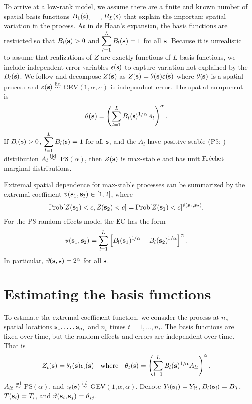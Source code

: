 \documentclass[aoas]{imsart}
\begin{document}
To arrive at a low-rank model, we assume there are a finite and known number of spatial basis functions $B_1(\mathbf{s}), \ldots, B_L(\mathbf{s})$ that explain the important spatial variation in the process.
As in de Haan's expansion, the basis functions are restricted so that $B_l(\mathbf{s}) > 0$ and $\displaystyle \sum_{l = 1}^L B_l(\mathbf{s}) = 1$ for all $\mathbf{s}$.
Because it is unrealistic to assume that realizations of $Z$ are exactly functions of $L$ basis functions, we include independent error variables $\epsilon(\mathbf{s})$ to capture variation not explained by the $B_l(\mathbf{s})$.
We follow \citet{Reich2012} and decompose $Z(\mathbf{s})$ as $Z(\mathbf{s})=\theta(\mathbf{s})\varepsilon(\mathbf{s})$ where $\theta(\mathbf{s})$ is a spatial process and $\varepsilon(\mathbf{s})\stackrel{\mathrm{iid}}{\sim}$ GEV$(1,\alpha,\alpha)$ is independent error.
The spatial component is
\begin{align} \label{ebeq:theta}
  \theta(\bs) = \left(\sum_{l=1}^LB_{l}(\bs)^{1/\alpha}A_{l}\right)^{\alpha}.
\end{align}
If $B_{l}(\mathbf{s})>0$, $\displaystyle \sum_{l=1}^LB_{l}(\mathbf{s})=1$ for all $\mathbf{s}$, and the $A_{l}$ have positive stable (PS; ) distribution \mbox{$A_{l}\stackrel{\mathrm{iid}}{\sim}$ PS$(\alpha)$}, then $Z(\mathbf{s})$ is max-stable and has unit $\mbox{Fr$\acute{\mbox{e}}$chet }$ marginal distributions.

Extremal spatial dependence for max-stable processes can be summarized by the extremal coefficient \citep[EC]{Schlather2003} $\vartheta(\mathbf{s}_1, \mathbf{s}_2)\in[1,2]$, where
\begin{align} \label{ebeq:ECdev}
  \mbox{Prob}[Z(\bs_1)<c, Z(\bs_2)<c] = \mbox{Prob}[Z(\bs_1)<c]^{\vartheta(\bs_1,\bs_2)}.
\end{align}
For the PS random effects model the EC has the form
\begin{align} \label{ebeq:EC}
   \vartheta(\bs_1,\bs_2) = \sum_{l=1}^L \left[B_{l}(\bs_1)^{1/\alpha}+B_{l}(\bs_2)^{1/\alpha}\right]^\alpha.
\end{align}
In particular, $\vartheta(\mathbf{s},\mathbf{s}) = 2^{\alpha}$ for all $\mathbf{s}$.

\section{Estimating the basis functions} \label{ebs:estimation}

To estimate the extremal coefficient function, we consider the process at $n_s$ spatial locations $\mathbf{s}_1,\ldots,\mathbf{s}_{n_s}$ and $n_t$ times $t=1,\ldots,n_t$.
The basis functions are fixed over time, but the random effects and errors are independent over time.
That is
\begin{align}
  Z_t(\bs) = \theta_t(\bs) \epsilon_t(\bs) \quad \mathrm{where} \quad \theta_t(\bs) = \left(\displaystyle \sum_{l=1}^L B_{l}(\bs)^{1/\alpha}A_{lt}\right)^{\alpha},
\end{align}
$A_{lt} \stackrel{\mathrm{iid}}{\sim}$ PS$(\alpha)$, and $\epsilon_t(\mathbf{s}) \stackrel{\mathrm{iid}}{\sim}$ GEV$(1, \alpha, \alpha)$.
Denote $Y_t(\mathbf{s}_i) = Y_{it}$, $B_l(\mathbf{s}_i) = B_{il}$, $T(\mathbf{s}_i)=T_i$, and $\vartheta(\mathbf{s}_i,\mathbf{s}_j) = \vartheta_{ij}$.
\end{document}
